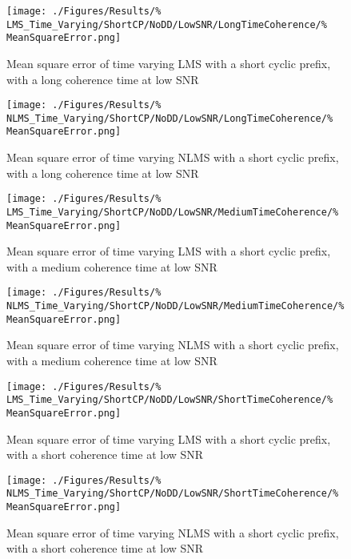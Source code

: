 \begin{figure}[ht]
	\centering
	\begin{minipage}{0.49\textwidth}
		\centering
		\texttt{[image: ./Figures/Results/\%
	LMS\_Time\_Varying/ShortCP/NoDD/LowSNR/LongTimeCoherence/\%
	MeanSquareError.png]}
		\captionsetup{width=0.75\linewidth}
		\caption{Mean square error of time varying LMS with a 
		short cyclic prefix, with a long coherence time at 
		low SNR}
	\end{minipage}
	\begin{minipage}{0.49\textwidth}
		\centering
		\texttt{[image: ./Figures/Results/\%
	NLMS\_Time\_Varying/ShortCP/NoDD/LowSNR/LongTimeCoherence/\%
	MeanSquareError.png]}
		\captionsetup{width=0.75\linewidth}
		\caption{Mean square error of time varying NLMS with 
		a short cyclic prefix, with a long coherence time 
		at low SNR}
	\end{minipage}
\end{figure}

\begin{figure}[ht]
	\centering
	\begin{minipage}{0.49\textwidth}
		\centering
		\texttt{[image: ./Figures/Results/\%
	LMS\_Time\_Varying/ShortCP/NoDD/LowSNR/MediumTimeCoherence/\%
	MeanSquareError.png]}
		\captionsetup{width=0.75\linewidth}
		\caption{Mean square error of time varying LMS with a 
		short cyclic prefix, with a medium coherence time at 
		low SNR}
	\end{minipage}
	\begin{minipage}{0.49\textwidth}
		\centering
		\texttt{[image: ./Figures/Results/\%
	NLMS\_Time\_Varying/ShortCP/NoDD/LowSNR/MediumTimeCoherence/\%
	MeanSquareError.png]}
		\captionsetup{width=0.75\linewidth}
		\caption{Mean square error of time varying NLMS with 
		a short cyclic prefix, with a medium coherence 
		time at low SNR}
	\end{minipage}
\end{figure}

\begin{figure}[ht]
	\centering
	\begin{minipage}{0.49\textwidth}
		\centering
		\texttt{[image: ./Figures/Results/\%
	LMS\_Time\_Varying/ShortCP/NoDD/LowSNR/ShortTimeCoherence/\%
	MeanSquareError.png]}
		\captionsetup{width=0.75\linewidth}
		\caption{Mean square error of time varying LMS with a 
		short cyclic prefix, with a short coherence time at 
		low SNR}
	\end{minipage}
	\begin{minipage}{0.49\textwidth}
		\centering
		\texttt{[image: ./Figures/Results/\%
	NLMS\_Time\_Varying/ShortCP/NoDD/LowSNR/ShortTimeCoherence/\%
	MeanSquareError.png]}
		\captionsetup{width=0.75\linewidth}
		\caption{Mean square error of time varying NLMS with 
		a short cyclic prefix, with a short coherence time 
		at low SNR}
	\end{minipage}
\end{figure}

